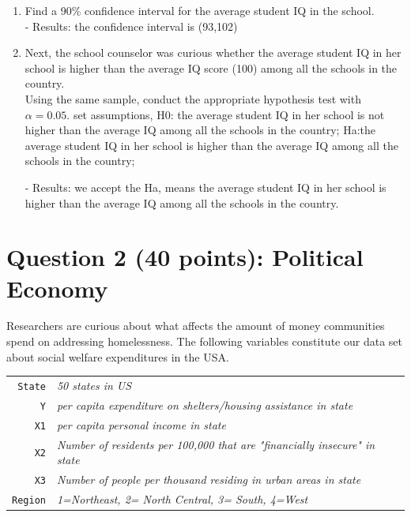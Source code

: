 \documentclass[12pt,letterpaper]{article}
\begin{document}
	\begin{enumerate}
		\item Find a 90\% confidence interval for the average student IQ in the school.\\
		
		  
		\noindent - Results: the confidence interval is (93,102)
		\item Next, the school counselor was curious  whether  the average student IQ in her school is higher than the average IQ score (100) among all the schools in the country.\\ 
		\noindent Using the same sample, conduct the appropriate hypothesis test with $\alpha=0.05$.		
		\vspace{1cm}
		\noindent set assumptions, H0: the average student IQ in her school is not higher than the average IQ among all the schools in the country;  Ha:the average student IQ in her school is higher than the average IQ among all the schools in the country;
		  
		\noindent - Results: we accept the Ha, means the average student IQ in her school is higher than the average IQ among all the schools in the country.
		

	\end{enumerate}
	
	\newpage
	
	\section*{Question 2 (40 points): Political Economy}
	
	\noindent Researchers are curious about what affects the amount of money communities spend on addressing homelessness. The following variables constitute our data set about social welfare expenditures in the USA. \\
	\vspace{.5cm}
	
	
	\begin{tabular}{r|l}
		\texttt{State} &\emph{50 states in US} \\
		\texttt{Y} & \emph{per capita expenditure on shelters/housing assistance in state}\\
		\texttt{X1} &\emph{per capita personal income in state} \\
		\texttt{X2} &  \emph{Number of residents per 100,000 that are "financially insecure" in state}\\
		\texttt{X3} &  \emph{Number of people per thousand residing in urban areas in state} \\
		\texttt{Region} &  \emph{1=Northeast, 2= North Central, 3= South, 4=West} \\
	\end{tabular}
	
\end{document}
